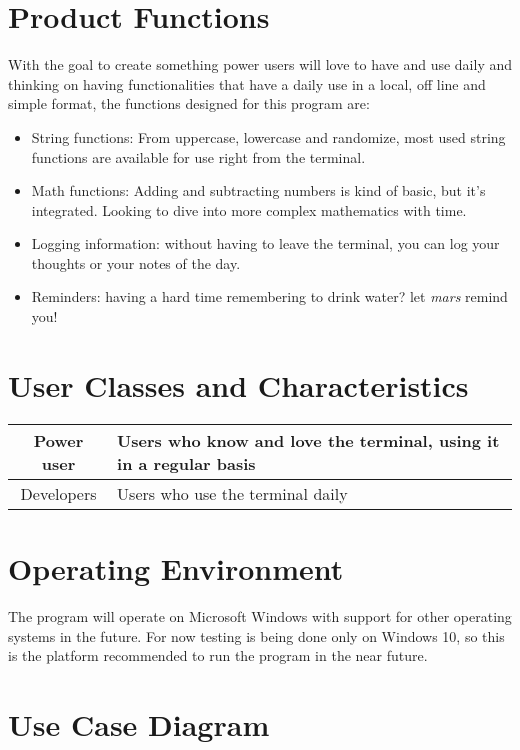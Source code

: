 \documentclass{report}
\begin{document}
\section{Product Functions}
With the goal to create something power users will love to have and use daily and thinking on having functionalities that have a daily use in a local, off line and simple format, the functions designed for this program are:
\begin{itemize}
\item{String functions: From uppercase, lowercase and randomize, most used string functions are available for use right from the terminal.}
\item{Math functions: Adding and subtracting numbers is kind of basic, but it's integrated. Looking to dive into more complex mathematics with time.}
\item{Logging information: without having to leave the terminal, you can log your thoughts or your notes of the day.}
\item{Reminders: having a hard time remembering to drink water? let \emph{mars} remind you!}
\end{itemize}

\section{User Classes and Characteristics}
\begin{center}
\begin{tabular}{|| c | p{7cm} ||}
\hline
Power user & Users who know and love the terminal, using it in a regular basis \\
\hline
Developers & Users who use the terminal daily \\
\hline
\end{tabular}
\end{center}

\section{Operating Environment}
The program will operate on Microsoft Windows with support for other operating systems in the future. For now testing is being done only on Windows 10, so this is the platform recommended to run the program in the near future.

\section{Use Case Diagram}
\end{document}
